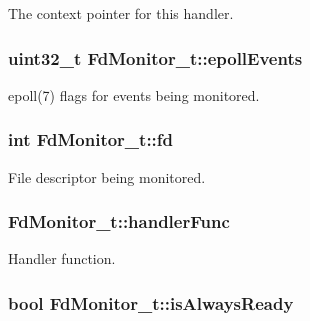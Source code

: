 The context pointer for this handler. 

\subsubsection[{\texorpdfstring{epoll\+Events}{epollEvents}}]{\setlength{\rightskip}{0pt plus 5cm}uint32\+\_\+t Fd\+Monitor\+\_\+t\+::epoll\+Events}\hypertarget{struct_fd_monitor__t_ad12ec515b59a276c77b16fec3a131527}{}\label{struct_fd_monitor__t_ad12ec515b59a276c77b16fec3a131527}


epoll(7) flags for events being monitored. 

\subsubsection[{\texorpdfstring{fd}{fd}}]{\setlength{\rightskip}{0pt plus 5cm}int Fd\+Monitor\+\_\+t\+::fd}\hypertarget{struct_fd_monitor__t_a233a2a23638f13a928611ba36d048e2c}{}\label{struct_fd_monitor__t_a233a2a23638f13a928611ba36d048e2c}


File descriptor being monitored. 

\subsubsection[{\texorpdfstring{handler\+Func}{handlerFunc}}]{ Fd\+Monitor\+\_\+t\+::handler\+Func}\hypertarget{struct_fd_monitor__t_ae26ea9df90494512110b00f1c42dacba}{}\label{struct_fd_monitor__t_ae26ea9df90494512110b00f1c42dacba}


Handler function. 

\subsubsection[{\texorpdfstring{is\+Always\+Ready}{isAlwaysReady}}]{\setlength{\rightskip}{0pt plus 5cm}bool Fd\+Monitor\+\_\+t\+::is\+Always\+Ready}\hypertarget{struct_fd_monitor__t_a44f77038490b4159469a5f1622c8def0}{}\label{struct_fd_monitor__t_a44f77038490b4159469a5f1622c8def0}


